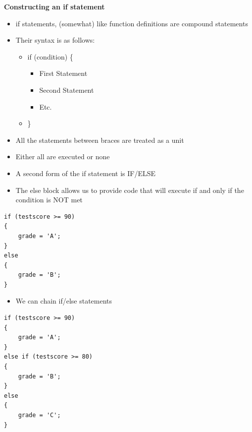 \documentclass{beamer}
\begin{document}
\begin{frame}
\textbf{Constructing an if statement}
\begin{itemize}
\item if statements, (somewhat) like function definitions are compound statements
\item Their syntax is as follows:
\begin{itemize}
\item if (condition) \{
\begin{itemize}
\item First Statement
\item Second Statement
\item Etc.
\end{itemize}
\item \}
\end{itemize}
\item All the statements between braces are treated as a unit
\item Either all are executed or none
\end{itemize}
\end{frame}

\begin{frame}[fragile]
\begin{itemize}
\item A second form of the if statement is IF/ELSE
\item The else block allows us to provide code that will execute if and only if the condition is NOT met
\end{itemize}
\begin{block}{}
\begin{lstlisting}
if (testscore >= 90) 
{
    grade = 'A';
} 
else
{
    grade = 'B';
}
\end{lstlisting}
\end{block}
\end{frame}

\begin{frame}[fragile]
\begin{itemize}
\item We can chain if/else statements
\end{itemize}

\begin{block}{}
\begin{lstlisting}
if (testscore >= 90) 
{
    grade = 'A';
} 
else if (testscore >= 80) 
{
    grade = 'B';
}
else
{
    grade = 'C';
}
\end{lstlisting}
\end{block}
\end{frame}
\end{document}
